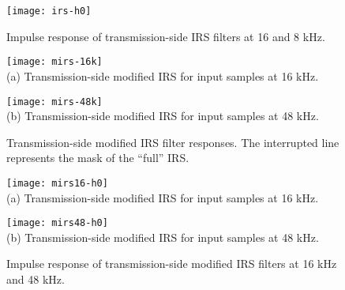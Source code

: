 \begin{figure}[hbtp]
  \begin{center}
     \texttt{[image: irs-h0]}
  \end{center}
  \caption{\SF Impulse response of transmission-side IRS filters
               at 16 and 8 kHz. \label{tx-reg-irs-ir}
          }
\end{figure}


\begin{figure}[hbtp]
  \begin{center}
     \texttt{[image: mirs-16k]}
     \\
   (a) Transmission-side modified IRS for input samples at 16 kHz.

     \texttt{[image: mirs-48k]}
    \\
   (b) Transmission-side modified IRS for input samples at 48 kHz.

  \end{center}
  \caption{\SF Transmission-side modified IRS filter responses. The
               interrupted line represents the mask of the ``full'' IRS.
               \label{tx-mod-irs-frq}}
\end{figure}


\begin{figure}[hbtp]
  \begin{center}
     \texttt{[image: mirs16-h0]}
    \\
   (a) Transmission-side modified IRS for input samples at 16 kHz.

     \texttt{[image: mirs48-h0]}
    \\
   (b) Transmission-side modified IRS for input samples at 48 kHz.

  \end{center}
  \caption{\SF Impulse response of transmission-side modified IRS filters
               at 16 kHz and 48 kHz. \label{tx-mod-irs-ir}
          }
\end{figure}


